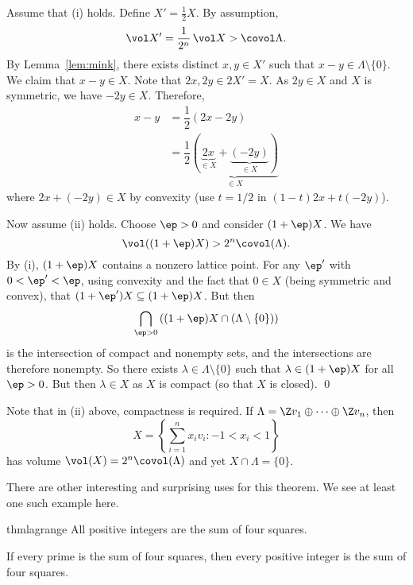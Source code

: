 \pf Assume that (i) holds. Define $X'= \frac{1}{2} X$. By assumption,
	\[
	\vol X' = \dfrac{1}{2^n} \, \vol X > \covol \Lambda.
	\]
By Lemma~\ref{lem:mink}, there exists distinct $x,y \in X'$ such that $x-y \in \Lambda \setminus\{0\}$. We claim that $x-y \in X$. Note that $2x,2y \in 2X'=X$. As $2y \in X$ and $X$ is symmetric, we have $-2y \in X$. Therefore,
	\[
	\begin{split}
	x-y &= \dfrac{1}{2}(2x-2y) \\
	&= \dfrac{1}{2} \underbrace{\left( \underbrace{2x}_{\in X} + \underbrace{(-2y)}_{\in X} \right)}_{\in X}
	\end{split}
	\]
where $2x+(-2y) \in X$ by convexity (use $t=1/2$ in $(1-t)2x + t(-2y)$). 

Now assume (ii) holds. Choose $\ep>0$ and consider $(1+\ep)X$. We have
	\[
	\vol((1+\ep)X) > 2^n \covol(\Lambda).
	\]
By (i), $(1+\ep)X$ contains a nonzero lattice point. For any $\ep'$ with $0<\ep'<\ep$, using convexity and the fact that $0 \in X$ (being symmetric and convex), that $(1+\ep')X \subseteq (1+\ep)X$. But then
	\[
	\bigcap_{\ep>0} \left( (1+\ep)X \cap (\Lambda \setminus \{0\}) \right)
	\]
is the intersection of compact and nonempty sets, and the intersections are therefore nonempty. So there exists $\lambda \in \Lambda \setminus \{0\}$ such that $\lambda \in (1+\ep)X$ for all $\ep>0$. But then $\lambda \in X$ as $X$ is compact (so that $X$ is closed). \qed \\


\begin{rem}
Note that in (ii) above, compactness is required. If $\Lambda= \Z v_1 \oplus \cdots \oplus \Z v_n$, then
	\[
	X= \left\{ \sum_{i=1}^n x_i v_i \colon -1< x_i <1 \right\}
	\]
has volume $\vol(X)=2^n\covol(\Lambda)$ and yet $X \cap \Lambda=\{0\}$. 
\end{rem}

There are other interesting and surprising uses for this theorem. We see at least one such example here.

\begin{restatable}[Lagrange]{thm}{lagrange}
All positive integers are the sum of four squares. 
\end{restatable}

\begin{lem}\label{lem:lag1}
If every prime is the sum of four squares, then every positive integer is the sum of four squares.
\end{lem}

